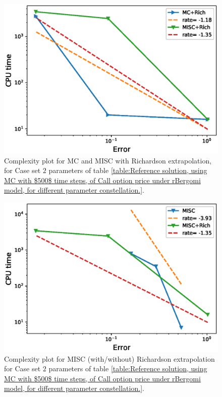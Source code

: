 \documentclass[11pt]{article}
\begin{document}
\begin{figure}[h!]
	\centering
	\includegraphics[width=0.7\linewidth]{./figures/rBergomi_Complexity_rates/set2/error_vs_time_set2_rich}
	
	\caption{Complexity plot for  MC and MISC with Richardson extrapolation, for Case set $2$ parameters of table \ref{table:Reference solution, using MC with $500$ time steps, of Call option price under rBergomi model, for different parameter constellation.}.}
	\label{fig:Complexity plot for MC and MISC for Case set $2$ parameters, richardson}
\end{figure}


\begin{figure}[h!]
	\centering
	\includegraphics[width=0.7\linewidth]{./figures/rBergomi_Complexity_rates/set2/error_vs_time_set2_comparison}
	
	\caption{Complexity plot for  MISC (with/without) Richardson extrapolation for Case set $2$ parameters of table \ref{table:Reference solution, using MC with $500$ time steps, of Call option price under rBergomi model, for different parameter constellation.}.}
	\label{fig:Complexity plot for  MISC for Case set $2$ parameters, comparison}
\end{figure}
\FloatBarrier
\end{document}
